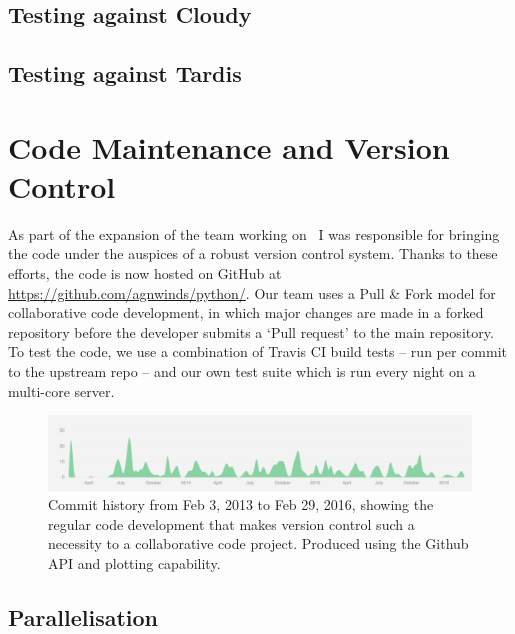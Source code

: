 \subsection{Testing against Cloudy}



\subsection{Testing against Tardis}


\section{Code Maintenance and Version Control}
\label{sec:code_maintenance}

As part of the expansion of the team working on \py\, I was responsible
for bringing the code under the auspices of a robust version control system.
Thanks to these efforts, the code is now hosted on GitHub at 
\url{https://github.com/agnwinds/python/}. Our team uses a Pull \& Fork model
for collaborative code development, in which major changes are made in a 
forked repository before the developer submits a `Pull request' to the main 
repository. To test the code, we use a combination of Travis CI build tests 
-- run per commit to the upstream repo -- and our own test suite which is 
run every night on a multi-core server. 

\begin{figure}
\centering
\includegraphics[width=1.0\textwidth]{figures/03-radtrans/github1.png}
\caption
{
Commit history from Feb 3, 2013 to Feb 29, 2016, showing the regular code development
that makes version control such a necessity to a collaborative code project. Produced
using the Github API and plotting capability.
} 
\label{fig:github}
\end{figure}

\subsection{Parallelisation} 










